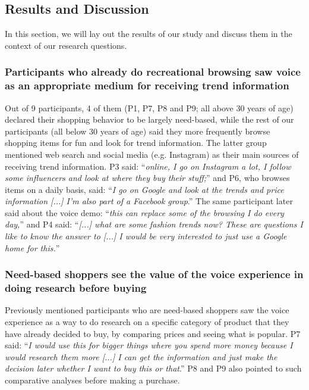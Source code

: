 \subsection{Results and Discussion}

In this section, we will lay out the results of our study and discuss them in the context of our research questions.

\subsubsection{\textbf{Participants who already do recreational browsing saw voice as an appropriate medium for receiving trend information}} Out of 9 participants, 4 of them (P1, P7, P8 and P9; all above 30 years of age) declared their shopping behavior to be largely need-based, while the rest of our participants (all below 30 years of age) said they more frequently browse shopping items for fun and look for trend information. The latter group mentioned web search and social media (e.g. Instagram) as their main sources of receiving trend information. P3 said: ``\textit{online, I go on Instagram a lot, I follow some influencers and look at where they buy their stuff;}'' and P6, who browses items on a daily basis, said: ``\textit{I go on Google and look at the trends and price information [...] I'm also part of a Facebook group}.'' The same participant later said about the voice demo: ``\textit{this can replace some of the browsing I do every day,}'' and P4 said: ``\textit{[...] what are some fashion trends now? These are questions I like to know the answer to [...] I would be very interested to just use a Google home for this.}''

\subsubsection{\textbf{Need-based shoppers see the value of the voice experience in doing research before buying}} Previously mentioned participants who are need-based shoppers saw the voice experience as a way to do research on a specific category of product that they have already decided to buy, by comparing prices and seeing what is popular. P7 said: ``\textit{I would use this for bigger things where you spend more money because I would research them more [...] I can get the information and just make the decision later whether I want to buy this or that}.'' P8 and P9 also pointed to such comparative analyses before making a purchase.

